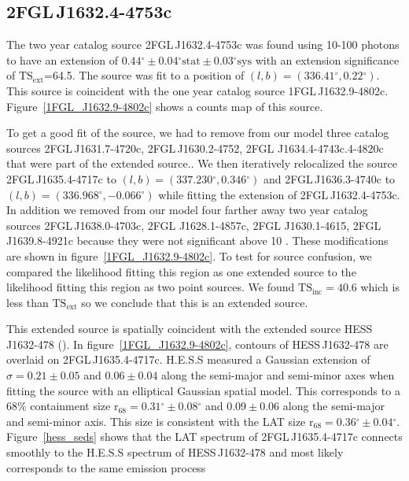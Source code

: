 \documentclass[12pt,preprint]{aastex}
\newcommand{\gev}{\text{GeV}\xspace}
\newcommand{\tev}{\text{TeV}\xspace}
\newcommand{\tsext}{{\ensuremath{\text{TS}_{\text{ext}}}}\xspace}
\newcommand{\tsinc}{\ensuremath{\text{TS}_{\text{inc}}}\xspace}
\newcommand{\rsixeight}{{\ensuremath{\text{r}_{68}}}\xspace}
\newcommand{\sys}{\text{sys}\xspace}
\newcommand{\stat}{\text{stat}\xspace}
\renewcommand{\deg}{\ensuremath{^\circ}\xspace}
\begin{document}

\subsection{2FGL\,J1632.4-4753c}
\label{section_2FGL_J1632.4-4753c}



The two year catalog source 2FGL\,J1632.4-4753c was found 
using 10-100 \gev photons to
have an extension of $0.44\deg\pm0.04\deg\stat\pm0.03\deg\sys$ 
with an extension
significance of \tsext=64.5.  The source was fit to a position of
$(l,b)=(336.41\deg,0.22\deg)$.  This source is coincident with the one
year catalog source 1FGL\,J1632.9-4802c.  Figure~\ref{1FGL_J1632.9-4802c}
shows a counts map of this source.

To get a good fit of the source, we had to remove from our model
three catalog sources 2FGL\,J1631.7-4720c, 2FGL\,J1630.2-4752,
2FGL J1634.4-4743c.4-4820c that were part of the extended source..
We then iteratively relocalized the source 2FGL\,J1635.4-4717c
to $(l,b)=(337.230\deg,0.346\deg)$ and 2FGL\,J1636.3-4740c to
$(l,b)=(336.968\deg,-0.066\deg)$ while fitting the extension of
2FGL\,J1632.4-4753c.  In addition we removed from our model four
farther away two year catalog sources 2FGL\,J1638.0-4703c, 2FGL
J1628.1-4857c, 2FGL  J1630.1-4615, 2FGL\,J1639.8-4921c because they
were not significant above 10 \gev.  These modifications are shown
in figure~\ref{1FGL_J1632.9-4802c}.  To test for source confusion,
we compared the likelihood fitting this region as one extended source
to the likelihood fitting this region as two point sources. We found
$\tsinc=40.6$ which is less than \tsext so we conclude
that this is an extended source.

This extended source is spatially coincident with the extended
\tev source HESS\,J1632-478 (\cite{hess_plane_survey}).  In
figure~\ref{1FGL_J1632.9-4802c}, contours of  HESS\,J1632-478 are
overlaid on 2FGL\,J1635.4-4717c.  H.E.S.S measured a Gaussian extension of
$\sigma=0.21\pm0.05$ and $0.06\pm0.04$ along the semi-major and semi-minor
axes when fitting the source with an elliptical Gaussian spatial model.
This corresponds to a 68\% containment size $\rsixeight=0.31\deg\pm0.08\deg$
and $0.09\pm0.06$ along the semi-major and semi-minor axis. This
size is consistent with the LAT size $\rsixeight=0.36\deg\pm0.04\deg$.
Figure~\ref{hess_seds} shows that the LAT spectrum of 2FGL\,J1635.4-4717c
connects smoothly to the H.E.S.S spectrum of HESS\,J1632-478 and most
likely corresponds to the same emission process
\end{document}
